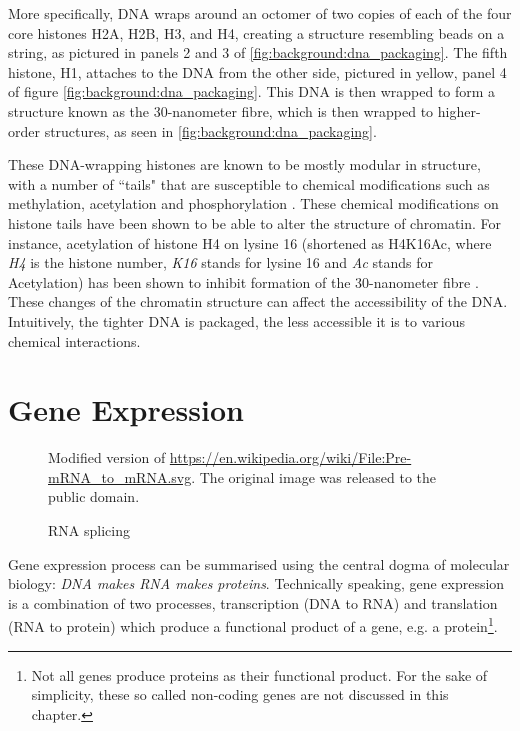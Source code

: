\documentclass[parskip]{cs4rep}
\newcommand{\histonemodification}[1]{#1}
\begin{document}
More specifically, DNA wraps around an octomer of two copies of each of the four core histones H2A, H2B, H3, and H4, creating a structure resembling beads on a string, as pictured in panels 2 and 3 of \autoref{fig:background:dna_packaging}. The fifth histone, H1, attaches to the DNA from the other side, pictured in yellow, panel 4 of figure \ref{fig:background:dna_packaging}. This DNA is then wrapped to form a structure known as the 30-nanometer fibre, which is then  wrapped to higher-order structures, as seen in \autoref{fig:background:dna_packaging}.

These DNA-wrapping histones are known to be mostly modular in structure, with a number of ``tails" that are susceptible to chemical modifications such as methylation, acetylation and phosphorylation \cite{Fischle:2003tl,Kouzarides:2007js}. These chemical modifications on histone tails have been shown to be able to alter the structure of chromatin. For instance, acetylation of histone H4 on lysine 16 (shortened as \histonemodification{H4K16Ac}, where \emph{H4} is the histone number, \emph{K16} stands for lysine 16 and \emph{Ac} stands for Acetylation) has been shown to inhibit formation of the 30-nanometer fibre \cite{ShogrenKnaak:2006gt}. These changes of the chromatin structure can affect the accessibility of the DNA. Intuitively, the tighter DNA is packaged, the less accessible it is to various chemical interactions.

\section{Gene Expression}
\begin{figure}[t]
\centering
{}
{\centering Modified version of \url{https://en.wikipedia.org/wiki/File:Pre-mRNA_to_mRNA.svg}. The original image was released to the public domain.}
\caption{RNA splicing}
\label{fig:background:splicing}
\end{figure}

Gene expression process can be summarised using the central dogma of molecular biology: 
\emph{DNA makes RNA makes proteins}. Technically speaking, gene expression is a combination of two processes, transcription (DNA to RNA) and
translation (RNA to protein) which produce a functional product of a gene, e.g. a protein\footnote{Not all genes produce proteins as their functional product. For the sake of simplicity, these so called non-coding genes are not discussed in this chapter.}.
\end{document}
